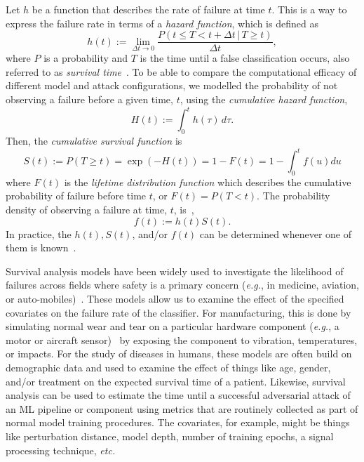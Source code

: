 Let $h$ be a function that describes the rate of failure at time $t$.
This is a way to express the failure rate in terms of a \textit{hazard function}, which is defined as
\begin{equation}
    h(t) := \lim_{ \Delta t \rightarrow 0} \frac{P(t \leq T < t + \Delta t \,|\, T \geq t)}{\Delta t},
    \label{eq:failure_rate_h}
\end{equation}
where  $P$ is a probability and $T$ is the time until a false classification occurs, also referred to as \textit{survival time}~\cite{kleinbaum1996survival}.
To be able to compare the computational efficacy of different model and attack configurations, we modelled the probability of not observing a failure before a given time, $t$, using the \textit{cumulative hazard function},
\begin{equation}
     H(t) := \int_0^{t} h(\tau) \,d\tau.
     \label{eq:cdf}
\end{equation}
Then, the \textit{cumulative survival function} is
\begin{equation}
    S(t) := P(T \geq t) = \exp(-H(t)) = 1 - F(t) = 1-   \int_0^t f(u)du
    \label{eq:S(t)}
\end{equation}
where $F(t)$ is the \textit{lifetime distribution function} which describes the cumulative probability of failure before time $t$, or $F(t) = P(T < t)$.
The probability density of observing a failure at time, $t$, is~\cite{kleinbaum1996survival,collett2023modelling},
\begin{equation*}
    f(t) := h(t)S(t).
    \label{eq:pdf}
\end{equation*}
In practice, the $h(t), S(t)$, and/or $f(t)$ can be determined whenever one of them is known~\cite{kleinbaum1996survival}.

Survival analysis models have been widely used to investigate the likelihood of failures across fields where safety is a primary concern (\textit{e.g.}, in medicine, aviation, or auto-mobiles)~\cite{liu2013development,lawless1995methods}.
These models allow us to examine the effect of the specified covariates on the failure rate of the classifier.
For manufacturing, this is done by simulating normal wear and tear on a particular  hardware component (\textit{e.g.}, a motor or aircraft sensor)~\cite{liu2013development} by exposing the component to vibration, temperatures, or impacts.
For the study of diseases in humans, these models are often build on demographic data and used to examine the effect of things like age, gender, and/or treatment on the expected survival time of a patient.
Likewise, survival analysis can be used to estimate the time until a successful adversarial attack of an ML pipeline or component using metrics that are routinely collected as part of normal model training procedures. The covariates, for example, might be things like perturbation distance, model depth, number of training epochs, a signal processing technique, \textit{etc.}

